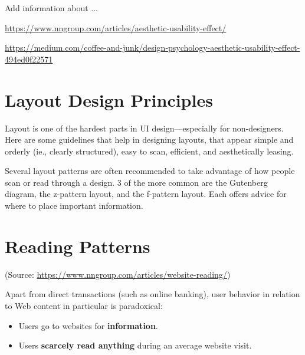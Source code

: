 \begin{tcolorbox}[
	width=\textwidth,
	title={\textbf{Excursus: What is the Aesthetic-Usability Effect?}},
	outer arc=0mm,
	arc=0mm,
	boxrule=1pt,
	]    
Add information about ...
\par \url{https://www.nngroup.com/articles/aesthetic-usability-effect/} 
\par \url{https://medium.com/coffee-and-junk/design-psychology-aesthetic-usability-effect-494ed0f22571}
\end{tcolorbox}

\label{sec:design_guidelines}

\section{Layout Design Principles} %
\label{sub:layout_design_principles}
Layout is one of the hardest parts in UI design---especially for non-designers.
Here are some guidelines that help in designing layouts, that appear simple and orderly (ie., clearly structured), easy to scan, efficient, and aesthetically leasing.

Several layout patterns are often recommended to take advantage of how people scan or read through a design. 3 of the more common are the Gutenberg diagram, the z-pattern layout, and the f-pattern layout. Each offers advice for where to place important information.



\section{Reading Patterns} %
\label{sub:reading_patterns}
(Source: \url{https://www.nngroup.com/articles/website-reading/})

Apart from  direct transactions (such as online banking), user behavior in relation to Web content in particular is paradoxical:
\begin{itemize}[--->]
	\item Users go to websites for \textbf{information}.
	\item Users \textbf{scarcely read anything} during an average website visit.
\end{itemize}


